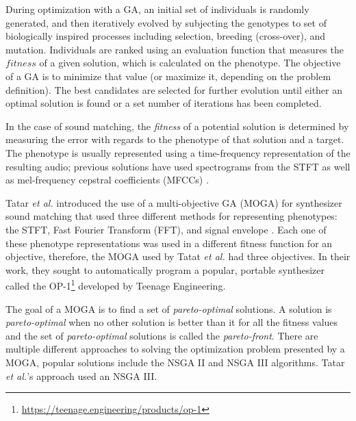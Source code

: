 During optimization with a GA, an initial set of individuals is randomly generated, and then iteratively evolved by subjecting the genotypes to set of biologically inspired processes including selection, breeding (cross-over), and mutation. Individuals are ranked using an evaluation function that measures the $fitness$ of a given solution, which is calculated on the phenotype. The objective of a GA is to minimize that value (or maximize it, depending on the problem definition). The best candidates are selected for further evolution until either an optimal solution is found or a set number of iterations has been completed.

In the case of sound matching, the \textit{fitness} of a potential solution is determined by measuring the error with regards to the phenotype of that solution and a target. The phenotype is usually represented using a time-frequency representation of the resulting audio; previous solutions have used spectrograms from the STFT \cite{horner1993machine, tatar2016automatic, masudo2021quality} as well as mel-frequency cepstral coefficients (MFCCs) \cite{yee2008synthbot, roth2011comparison, macret2014automatic, smith2017play}.


Tatar \textit{et al.} introduced the use of a multi-objective GA (MOGA) for synthesizer sound matching that used three different methods for representing phenotypes: the STFT, Fast Fourier Transform (FFT), and signal envelope \cite{tatar2016automatic}. Each one of these phenotype representations was used in a different fitness function for an objective, therefore, the MOGA used by Tatat \textit{et al.} had three objectives. In their work, they sought to automatically program a popular, portable synthesizer called the OP-1\footnote{\url{https://teenage.engineering/products/op-1}} developed by Teenage Engineering.

The goal of a MOGA is to find a set of \textit{pareto-optimal} solutions. A solution is \textit{pareto-optimal} when no other solution is better than it for all the fitness values and the set of \textit{pareto-optimal} solutions is called the \textit{pareto-front}. There are multiple different approaches to solving the optimization problem presented by a MOGA, popular solutions include the NSGA II \cite{deb2002fast} and NSGA III \cite{deb2013evolutionary} algorithms. Tatar \textit{et al.}'s approach used an NSGA III. 

